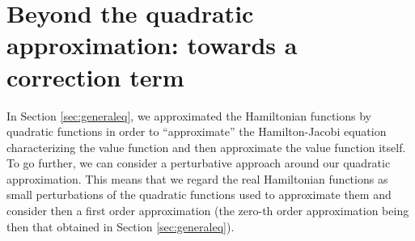 \documentclass[preprint, 3p]{elsarticle}
\newcommand{\1}{{\chi}}
\begin{document}
\section{Beyond the quadratic approximation: towards a correction term} \label{sec:perturbative}

In Section \ref{sec:generaleq}, we approximated the Hamiltonian functions by quadratic functions in order to ``approximate'' the Hamilton-Jacobi equation characterizing the value function and then approximate the value function itself. To go further, we can consider a perturbative approach around our quadratic approximation. This means that we regard the real Hamiltonian functions as small perturbations of the quadratic functions used to approximate them and consider then a first order approximation (the zero-th order approximation being then that obtained in Section \ref{sec:generaleq}).\\
\end{document}
